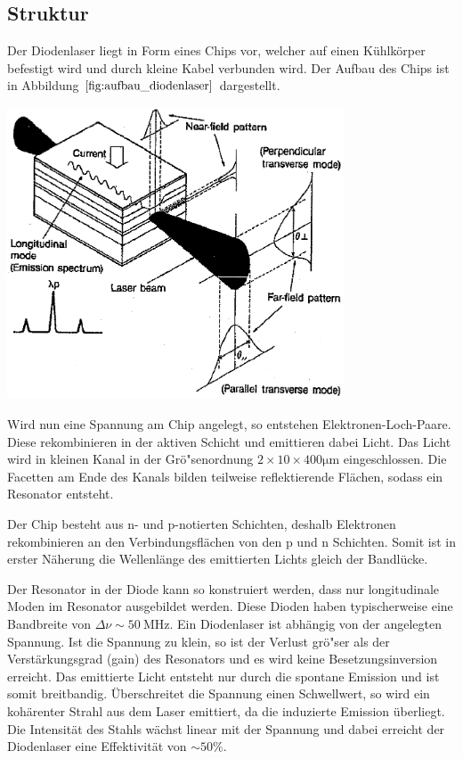 \documentclass[captions=tableheading]{scrartcl}
\begin{document}
\subsection{Struktur}
Der Diodenlaser liegt in Form eines Chips vor, welcher auf einen Kühlkörper befestigt wird und durch kleine Kabel verbunden wird. Der Aufbau des Chips ist in Abbildung $\ref{fig:aufbau_diodenlaser}$ dargestellt. 
\begin{center}
	\includegraphics[width=10cm]{images/aufbau_diodenlaser.png}
	\label{fig:aufbau_diodenlaser}
\end{center}
Wird nun eine Spannung am Chip angelegt, so entstehen Elektronen-Loch-Paare.
Diese rekombinieren in der aktiven Schicht und emittieren dabei Licht.
Das Licht wird in kleinen Kanal in der Grö"senordnung $2\times 10 \times 400\si{\micro\meter}$  eingeschlossen. 
Die Facetten am Ende des Kanals bilden teilweise reflektierende Flächen, sodass ein Resonator entsteht.

Der Chip besteht aus n- und p-notierten Schichten, deshalb Elektronen rekombinieren an den Verbindungsflächen von den p und n Schichten. 
Somit ist in erster Näherung die Wellenlänge des emittierten Lichts gleich der Bandlücke.

Der Resonator in der Diode kann so konstruiert werden, dass nur longitudinale Moden im Resonator ausgebildet werden. 
Diese Dioden haben typischerweise eine Bandbreite von $\Delta \nu \sim \SI{50}{\mega\hertz}$.
\newpage
Ein Diodenlaser ist abhängig von der angelegten Spannung. Ist die Spannung zu klein, so ist der Verlust grö"ser als der Verstärkungsgrad (gain) des Resonators und es wird keine Besetzungsinversion erreicht. Das emittierte Licht entsteht nur durch die spontane Emission und ist somit breitbandig.
Überschreitet die Spannung einen Schwellwert, so wird ein kohärenter Strahl aus dem Laser emittiert, da die induzierte Emission überliegt. 
Die Intensität des Stahls wächst linear mit der Spannung und dabei erreicht der Diodenlaser eine Effektivität von $\sim 50\%$.
\end{document}
